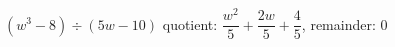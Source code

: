{$(w^3 - 8) \div (5w-10)$}
{quotient: $\dfrac{w^2}{5} + \dfrac{2w}{5} + \dfrac{4}{5}$, remainder: $0$
}